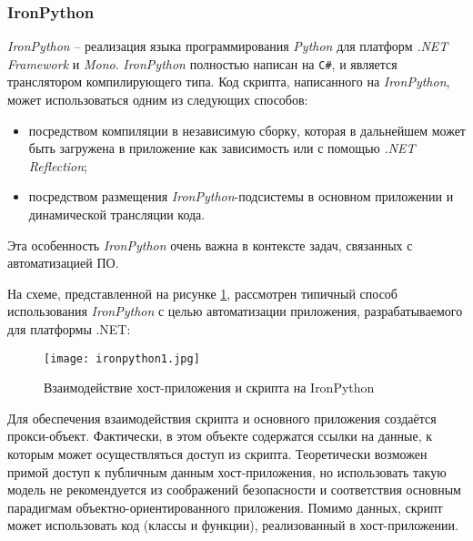\subsubsection{IronPython}

{\it IronPython} -- реализация языка программирования {\it Python} для платформ {\it .NET Framework} и {\it Mono}. {\it IronPython} полностью написан на {\tt C\#}, и является транслятором компилирующего типа. Код скрипта, написанного на {\it IronPython}, может использоваться одним из следующих способов:
\begin{itemize}
 \item посредством компиляции в независимую сборку, которая в дальнейшем может быть загружена в приложение как зависимость или с помощью {\it .NET Reflection};
 \item посредством размещения {\it IronPython}-подсистемы в основном приложении и динамической трансляции кода.
\end{itemize}

Эта особенность {\it IronPython} очень важна в контексте задач, связанных с автоматизацией ПО.

На схеме, представленной на рисунке \ref{ironpython-scheme}, рассмотрен типичный способ использования {\it IronPython} с целью автоматизации приложения, разрабатываемого для платформы .NET:

\begin{figure}[!h]
    \centering
    \texttt{[image: ironpython1.jpg]}
    \caption{Взаимодействие хост-приложения и скрипта на IronPython}
    \label{ironpython-scheme}
\end{figure}

Для обеспечения взаимодействия скрипта и основного приложения создаётся прокси-объект. Фактически, в этом объекте содержатся ссылки на данные, к которым может осуществляться доступ из скрипта. Теоретически возможен примой доступ к публичным данным хост-приложения, но использовать такую модель не рекомендуется из соображений безопасности и соответствия основным парадигмам объектно-ориентированного приложения. Помимо данных, скрипт может использовать код (классы и функции), реализованный в хост-приложении.